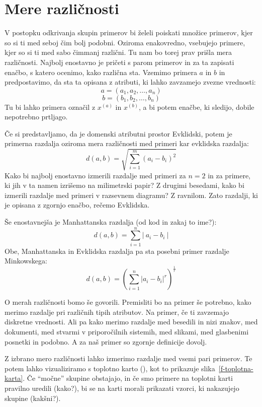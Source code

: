\section{Mere različnosti}

V postopku odkrivanja skupin primerov bi želeli poiskati množice
primerov, kjer so si ti med seboj čim bolj podobni. Oziroma
enakovredno, vsebujejo primere, kjer so si ti med sabo čimmanj
različni. Tu nam bo torej prav prišla mera različnosti. Najbolj
enostavno je pričeti s parom primerov in za ta zapisati enačbo, s
katero ocenimo, kako različna sta. Vzemimo primera $a$ in $b$ in
predpostavimo, da sta ta opisana z atributi, ki lahko zavzamejo zvezne
vrednosti:
%
$$ a = (a_1,a_2, \ldots, a_n) $$
$$ b = (b_1,b_2, \ldots, b_n) $$
%
Tu bi lahko primera označil z $x^{(a)}$ in $x^{(b)}$, a bi potem
enačbe, ki sledijo, dobile nepotrebno prtljago.

Če si predstavljamo, da je domenski atributni prostor Evklidski, potem
je primerna razdalja oziroma mera različnosti med primeri kar
evklidska razdalja:
$$ d(a,b)=\sqrt{\sum_{i=1}^m(a_i-b_i)^2} $$ 
%
Kako bi najbolj enostavno izmerili razdalje med primeri za $n=2$ in za
primere, ki jih v ta namen izrišemo na milimetrski papir? Z drugimi
besedami, kako bi izmerili razdalje med primeri v razsevnem diagramu?
Z ravnilom. Zato razdalji, ki je opisana z zgornjo enačbo, rečemo
Evklidska.

Še enostavnejša je Manhattanska razdalja (od kod in zakaj to ime?):
$$ d(a,b)={\sum_{i=1}^n|\ a_i-b_i\ |} $$
Obe, Manhattanska in Evklidska razdalja pa sta posebni primer razdalje
Minkowskega:
$$ d(a,b)=({\sum_{i=1}^n|a_i-b_i|^r})^{\frac{1}{r}} $$

O merah različnosti bomo še govorili. Premisliti bo na primer še
potrebno, kako merimo razdalje pri različnih tipih atributov. Na
primer, če ti zavzemajo diskretne vrednosti. Ali pa kako merimo
razdalje med besedili in nizi znakov, med dokumenti, med stvarmi v
priporočilnih sistemih, med slikami, med glasbenimi posnetki in
podobno. A za naš primer so zgornje definicije dovolj.

Z izbrano mero različnosti lahko izmerimo razdalje med vsemi
pari primerov. Te potem lahko vizualiziramo s toplotno karto
(), kot to prikazuje slika~\ref{f-toplotna-karta}. Če
``močne'' skupine obstajajo, in če smo primere na toplotni karti
pravilno uredili (kako?), bi se na karti morali prikazati vzorci, ki
nakazujejo skupine (kakšni?).

